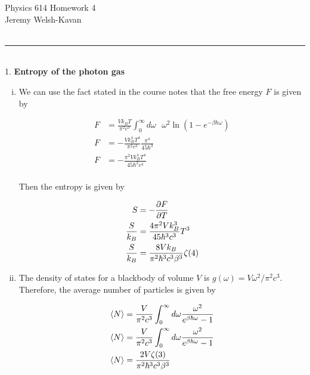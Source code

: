 \documentclass[]{article}
\begin{document}
{\Large Physics 614 Homework 4}\\
{Jeremy Welsh-Kavan}\\
\hfill \\
\noindent\rule{15cm}{0.4pt} \\

1. {\bf Entropy of the photon gas} \\

\begin{enumerate}[(i)]

\item We can use the fact stated in the course notes that the free energy $F$ is given by

\begin{equation}
\begin{split}
F & = \frac{Vk_BT}{\pi^2c^3} \int_{0}^{\infty} d\omega \text{ }\omega^2 \ln( 1 - e^{-\beta \hbar \omega} ) \\
F & = - \frac{Vk_B^4T^4}{\pi^2c^3}  \frac{\pi^4}{45 \hbar^3} \\ 
F & = - \frac{  \pi^2 V k_B^4 T^4 }{45 \hbar^3 c^3 } \\
\end{split}
\end{equation}

Then the entropy is given by

\begin{equation}
\begin{split}
S & = - \pdv{F}{T} \\
\frac{S}{k_B} & = \frac{ 4 \pi^2 V k_B^3 }{45 \hbar^3 c^3 } T^3 \\
\frac{S}{k_B} & = \frac{ 8 V k_B }{ \pi^2 \hbar^3 c^3 \beta^3} \zeta(4) \\
\end{split}
\end{equation}

\item The density of states for a blackbody of volume $V$ is $g(\omega) = V\omega^2/\pi^2 c^3$. Therefore, the average number of particles is given by

\begin{equation}
\begin{split}
\expval{ N} & = \frac{V}{\pi^2 c^3} \int_{0}^{\infty} d\omega\frac{  \omega^2 }{ e^{\beta\hbar\omega} - 1} \\
\expval{ N} & = \frac{V}{\pi^2 c^3} \int_{0}^{\infty} d\omega\frac{  \omega^2 }{ e^{\beta\hbar\omega} - 1} \\
\expval{ N } & = \frac{2V \zeta(3) }{\pi^2 \hbar^3 c^3 \beta^3} \\
\end{split}
\end{equation}


\end{enumerate}
\end{document}
